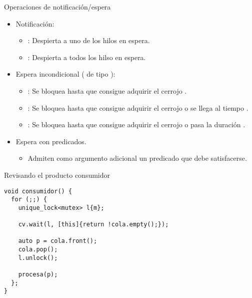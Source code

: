 \begin{frame}{Operaciones de notificación/espera}
\begin{itemize}
  \item Notificación:
    \begin{itemize}
      \item {}: Despierta a uno de los hilos en espera.
      \item {}: Despierta a todos los hilso en espera.
    \end{itemize}
  \item Espera incondicional ( de tipo ):
    \begin{itemize}
      \item {}: Se bloquea hasta que consigue adquirir el cerrojo .
      \item {}: Se bloquea hasta que consigue adquirir el cerrojo  o se llega al tiempo .
      \item {}: Se bloquea hasta que consigue adquirir el cerrojo  o pasa la duración .
    \end{itemize}
  \item Espera con predicados.
    \begin{itemize}
      \item Admiten como argumento adicional un predicado que debe satisfacerse.
    \end{itemize}
\end{itemize}
\end{frame}

\begin{frame}[fragile]{Revisando el producto consumidor}
\begin{lstlisting}
void consumidor() {
  for (;;) {
    unique_lock<mutex> l{m};

    cv.wait(l, [this]{return !cola.empty();});

    auto p = cola.front();
    cola.pop();
    l.unlock();
   
    procesa(p);
  };
}
\end{lstlisting}
\end{frame}

